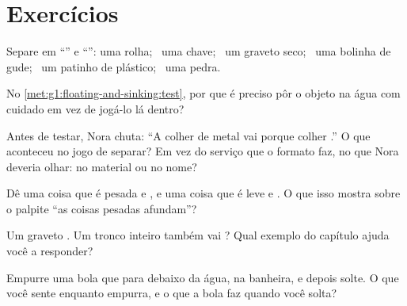 \section{Exercícios}

\begin{exercise}[$\star$]\label{exo:g1:floating-and-sinking:1}
Separe em ``'' e ``'': uma rolha; \ uma chave; \ um
graveto seco; \ uma bolinha de gude; \ um patinho de plástico; \ uma
pedra.
\end{exercise}

\begin{exercise}[$\star$]\label{exo:g1:floating-and-sinking:2}
No \cref{met:g1:floating-and-sinking:test}, por que é preciso pôr o
objeto na água com cuidado em vez de jogá-lo lá dentro?
\end{exercise}

\begin{exercise}[$\star$]\label{exo:g1:floating-and-sinking:3}
Antes de testar, Nora chuta: ``A colher de metal vai  porque
colher .'' O que aconteceu no jogo de separar? Em vez do
serviço que o formato faz, no que Nora deveria olhar: no material ou
no nome?
\end{exercise}

\begin{exercise}[$\star$]\label{exo:g1:floating-and-sinking:4}
Dê uma coisa que é pesada e , e uma coisa que é leve e .
O que isso mostra sobre o palpite ``as coisas pesadas afundam''?
\end{exercise}

\begin{exercise}[$\star$]\label{exo:g1:floating-and-sinking:5}
Um graveto . Um tronco inteiro também vai ? Qual exemplo
do capítulo ajuda você a responder?
\end{exercise}

\begin{exercise}[$\star$]\label{exo:g1:floating-and-sinking:6}
Empurre uma bola que  para debaixo da água, na banheira, e
depois solte. O que você sente enquanto empurra, e o que a bola faz
quando você solta?
\end{exercise}

